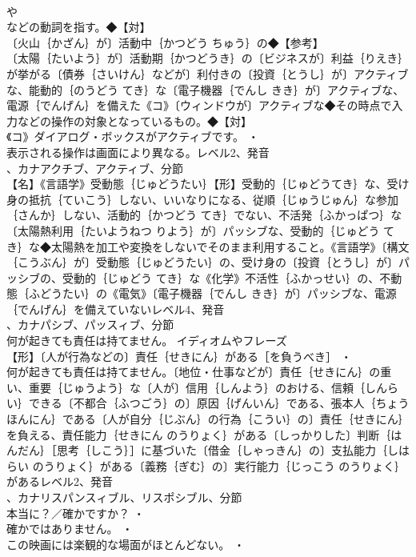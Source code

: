 \documentclass[8pt]{extreport}
\begin{document}
\begin{CJK}{UTF8}{min}
\\	や
\\	などの動詞を指す。◆【対】
\\	〔火山｛かざん｝が〕活動中｛かつどう ちゅう｝の◆【参考】
\\	〔太陽｛たいよう｝が〕活動期｛かつどうき｝の〔ビジネスが〕利益｛りえき｝が挙がる〔債券｛さいけん｝などが〕利付きの〔投資｛とうし｝が〕アクティブな、能動的｛のうどう てき｝な〔電子機器｛でんし きき｝が〕アクティブな、電源｛でんげん｝を備えた《コ》〔ウィンドウが〕アクティブな◆その時点で入力などの操作の対象となっているもの。◆【対】
\\	《コ》ダイアログ・ボックスがアクティブです。 ・
\\	表示される操作は画面により異なる。レベル2、発音
\\	、カナアクチブ、アクティブ、分節
\\	【名】《言語学》受動態｛じゅどうたい｝【形】受動的｛じゅどうてき｝な、受け身の抵抗｛ていこう｝しない、いいなりになる、従順｛じゅうじゅん｝な参加｛さんか｝しない、活動的｛かつどう てき｝でない、不活発｛ふかっぱつ｝な〔太陽熱利用｛たいようねつ りよう｝が〕パッシブな、受動的｛じゅどう てき｝な◆太陽熱を加工や変換をしないでそのまま利用すること。《言語学》〔構文｛こうぶん｝が〕受動態｛じゅどうたい｝の、受け身の〔投資｛とうし｝が〕パッシブの、受動的｛じゅどう てき｝な《化学》不活性｛ふかっせい｝の、不動態｛ふどうたい｝の《電気》〔電子機器｛でんし きき｝が〕パッシブな、電源｛でんげん｝を備えていないレベル4、発音
\\	、カナパシブ、パッスィブ、分節
\\	何が起きても責任は持てません。	イディオムやフレーズ 
\\	【形】〔人が行為などの〕責任｛せきにん｝がある［を負うべき］ ・
\\	何が起きても責任は持てません。〔地位・仕事などが〕責任｛せきにん｝の重い、重要｛じゅうよう｝な〔人が〕信用｛しんよう｝のおける、信頼｛しんらい｝できる〔不都合｛ふつごう｝の〕原因｛げんいん｝である、張本人｛ちょうほんにん｝である〔人が自分｛じぶん｝の行為｛こうい｝の〕責任｛せきにん｝を負える、責任能力｛せきにん のうりょく｝がある〔しっかりした〕判断｛はんだん｝［思考｛しこう｝］に基づいた〔借金｛しゃっきん｝の〕支払能力｛しはらい のうりょく｝がある〔義務｛ぎむ｝の〕実行能力｛じっこう のうりょく｝があるレベル2、発音
\\	、カナリスパンスィブル、リスポシブル、分節
\\	本当に？／確かですか？ ・
\\	確かではありません。 ・
\\	この映画には楽観的な場面がほとんどない。 ・

\end{CJK}
\end{document}
